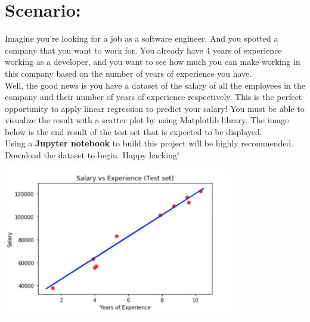 \documentclass{42-en}
\begin{document}
\section*{Scenario:}

Imagine you’re looking for a job as a software engineer. And you spotted a company that you want to work for. You already have 4 years of experience working as a developer, and you want to see how much you can make working in this company based on the number of years of experience you have.\\
Well, the good news is you have a dataset of the salary of all the employees in the company and their number of years of experience respectively. This is the perfect opportunity to apply linear regression to predict your salary!
You must be able to visualize the result with a scatter plot by using Matplotlib library. The image below is the end result of the test set that is expected to be displayed.\\
Using a \textbf{Jupyter notebook} to build this project will be highly recommended. Download the dataset to begin. Happy hacking!


\centerline{\includegraphics[width=100mm]{images/final.png}}

\nextexercice
\newpage
\end{document}
